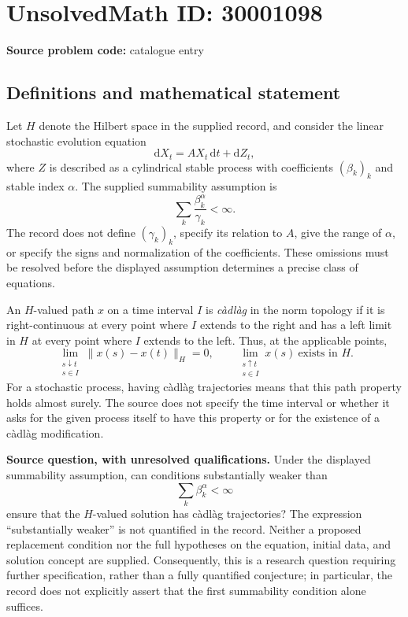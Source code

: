\documentclass[11pt]{article}
\begin{document}
\section*{UnsolvedMath ID: 30001098}
\textbf{Source problem code:} catalogue entry
\subsection{Definitions and mathematical statement}
Let \(H\) denote the Hilbert space in the supplied record, and consider the linear stochastic evolution equation
\[
\mathrm{d}X_t=AX_t\,\mathrm{d}t+\mathrm{d}Z_t,
\]
where \(Z\) is described as a cylindrical stable process with coefficients \((\beta_k)_k\) and stable index \(\alpha\). The supplied summability assumption is
\[
\sum_k\frac{\beta_k^{\alpha}}{\gamma_k}<\infty.
\]
The record does not define \((\gamma_k)_k\), specify its relation to \(A\), give the range of \(\alpha\), or specify the signs and normalization of the coefficients. These omissions must be resolved before the displayed assumption determines a precise class of equations.

An \(H\)-valued path \(x\) on a time interval \(I\) is \emph{c\`adl\`ag} in the norm topology if it is right-continuous at every point where \(I\) extends to the right and has a left limit in \(H\) at every point where \(I\) extends to the left. Thus, at the applicable points,
\[
\lim_{\substack{s\downarrow t\\s\in I}}\|x(s)-x(t)\|_H=0,
\qquad
\lim_{\substack{s\uparrow t\\s\in I}}x(s)\ \text{exists in }H.
\]
For a stochastic process, having c\`adl\`ag trajectories means that this path property holds almost surely. The source does not specify the time interval or whether it asks for the given process itself to have this property or for the existence of a c\`adl\`ag modification.

\textbf{Source question, with unresolved qualifications.} Under the displayed summability assumption, can conditions substantially weaker than
\[
\sum_k\beta_k^{\alpha}<\infty
\]
ensure that the \(H\)-valued solution has c\`adl\`ag trajectories? The expression ``substantially weaker'' is not quantified in the record. Neither a proposed replacement condition nor the full hypotheses on the equation, initial data, and solution concept are supplied. Consequently, this is a research question requiring further specification, rather than a fully quantified conjecture; in particular, the record does not explicitly assert that the first summability condition alone suffices.
\end{document}

